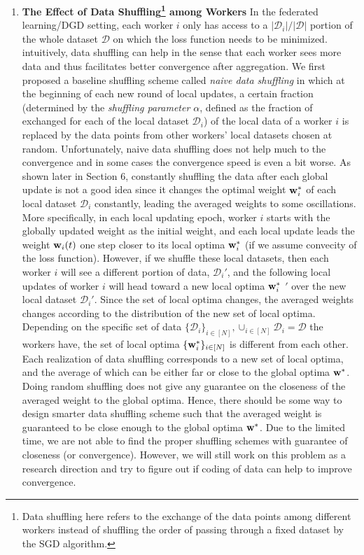 \documentclass[11pt, fullpage,letterpaper]{article}
\newcommand{\tbf}{\textbf}
\newcommand{\bw}{{\bf w}}
\begin{document}
\begin{enumerate}
\begin{enumerate}
\item \tbf{The Effect of Data Shuffling\footnote{Data shuffling here refers to the exchange of the data points among different workers instead of shuffling the order of passing through a fixed dataset by the SGD algorithm.} among Workers} In the federated learning/DGD setting, each worker $i$ only has access to a $|\mathcal{D}_i|/|\mathcal{D}|$ portion of the whole dataset $\mathcal{D}$  on which the loss function needs to be minimized. intuitively, data shuffling can help in the sense that each worker sees more data and thus facilitates better convergence after aggregation. We first proposed a baseline shuffling scheme called \emph{naive data shuffling} in which at the beginning of each new round of local updates, a certain fraction (determined by the \emph{shuffling parameter $\alpha$}, defined as the fraction of exchanged for each of the local dataset $\mathcal{D}_i$) of the local data of a worker $i$ is replaced by the data points from other workers' local datasets chosen at random. Unfortunately, naive data shuffling does not help much to the convergence and in some cases the convergence speed is even a bit worse. As shown later in Section 6, constantly shuffling the data after each global update is not a good idea since it changes the optimal weight $\bw_i^*$ of each local dataset $\mathcal{D}_i$ constantly, leading the averaged weights to some  oscillations. More specifically, in each local updating epoch, worker $i$ starts with the globally updated weight as the initial weight, and each local update leads the weight $\bw_i(t)$ one step closer to its local optima $\bw_i^*$ (if we assume convecity of the loss function). However, if we shuffle these local datasets, then each worker $i$ will see a different portion of data, $\mathcal{D}_i'$, and the following local updates of worker $i$ will head toward a new local optima $\bw_i^{*}$ $'$ over the new local dataset $\mathcal{D}_i'$. Since the set of local optima changes, the averaged weights changes according to the distribution of the new set of local optima. Depending on the specific set of data $\{\mathcal{D}_i\}_{i\in[N]}, \cup_{i\in [N]}\mathcal{D}_i =\mathcal{D}$ the workers have, the set of local optima $\{\bw_i^*\}_{i\in [N]}$ is different from each other. Each realization of data shuffling corresponds to a new set of  local optima, and the average of which can be either far or close to the global optima $\bw^*$. Doing random shuffling does not give any guarantee on the closeness of the averaged weight to the global optima. Hence, there should be some way to design smarter data shuffling scheme such that the averaged weight is guaranteed to be close enough to the global optima $\bw^*$. Due to the limited time, we are not able to find the proper shuffling schemes with guarantee of closeness (or convergence). However, we will still work on this problem as a research direction and try to figure out if coding of data can help to improve convergence.




\end{enumerate}
\end{enumerate}
\end{document}
